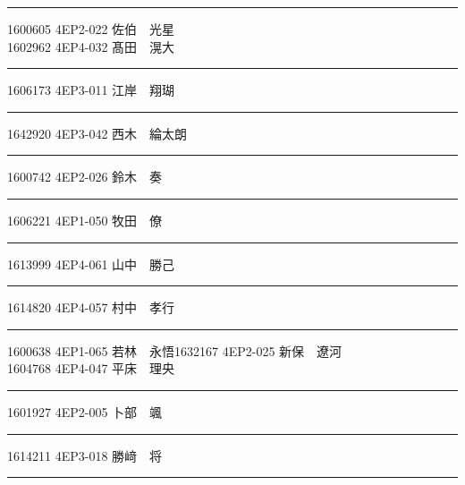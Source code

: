 \documentclass[a4paper,twocolumn,dvipdfmx,uplatex]{utarticle}
\begin{document}
\hrule
\vspace{1mm}
\hspace{1cm}1600605	4EP2-022 佐伯　光星\\\hspace{1cm}1602962	4EP4-032 髙田　滉大\vspace{1mm}%
\hrule\par\vspace{1mm}
\hspace{1cm}1606173	4EP3-011 江岸　翔瑚\vspace{1mm}
\vspace{0.6cm}
\hrule\par\vspace{1mm}
\hspace{1cm}1642920	4EP3-042 西木　綸太朗\vspace{1mm}%
\vspace{0.6cm}
\hrule\par\vspace{1mm}
\hspace{1cm}1600742	4EP2-026 鈴木　奏\vspace{1mm} %
\vspace{0.6cm}
\hrule\par\vspace{1mm}
\hspace{1cm}1606221	4EP1-050 牧田　僚\vspace{1mm} %
\vspace{0.6cm}
\hrule\par\vspace{1mm}
\hspace{1cm}1613999	4EP4-061 山中　勝己\vspace{1mm} %
\vspace{0.6cm}
\hrule\par\vspace{1mm}
\hspace{1cm}1614820	4EP4-057 村中　孝行\vspace{1mm} %
\vspace{0.6cm}
\hrule\par\vspace{1mm}
\hspace{1cm}1600638	4EP1-065 若林　永悟\hspace{1cm}1632167	4EP2-025 新保　遼河\\ %
\hspace{1cm}1604768	4EP4-047 平床　理央\vspace{1mm}
\hrule\par\vspace{1mm}
\hspace{1cm}1601927	4EP2-005 卜部　颯\vspace{1mm} %
\vspace{0.6cm}
\hrule\par\vspace{1mm}
\hspace{1cm}1614211	4EP3-018 勝﨑　将\vspace{1mm} %
\vspace{0.6cm}\hrule
\end{document}
